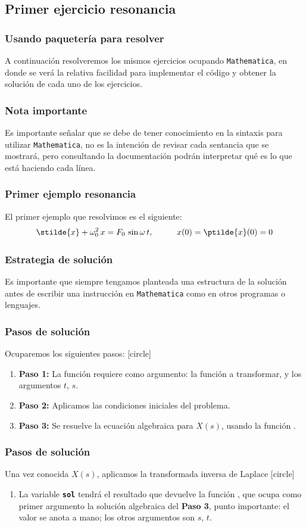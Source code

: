 \subsection{Primer ejercicio resonancia}
\begin{frame}
\frametitle{Usando paquetería para resolver}
A continuación resolveremos los mismos ejercicios ocupando \texttt{Mathematica}, en donde se verá la relativa facilidad para implementar el código y obtener la solución de cada uno de los ejercicios.
\end{frame}
\begin{frame}
\frametitle{Nota importante}
Es importante señalar que se debe de tener conocimiento en la sintaxis para utilizar \texttt{Mathematica}, no es la intención de revisar cada sentancia que se mostrará, pero consultando la documentación podrán interpretar qué es lo que está haciendo cada línea.
\end{frame}
\begin{frame}
\frametitle{Primer ejemplo resonancia}
El primer ejemplo que resolvimos es el siguiente:
\begin{align*}
\stilde{x} + \omega_{0}^{2} \, x = F_{0} \, \sin \omega \, t, \hspace{1cm} x(0) = \ptilde{x} (0) = 0
\end{align*}
\end{frame}
\begin{frame}
\frametitle{Estrategia de solución}
Es importante que siempre tengamos planteada una estructura de la solución antes de escribir una instrucción en \texttt{Mathematica} como en otros programas o lenguajes.
\end{frame}
\begin{frame}
\frametitle{Pasos de solución}
Ocuparemos los siguientes pasos:
[circle]
\begin{enumerate}[<+->]
\item \textbf{Paso 1: } La función  requiere como argumento: la función a transformar, y los argumentos $t$, $s$.
\item \textbf{Paso 2: } Aplicamos las condiciones iniciales del problema.
\item \textbf{Paso 3: } Se resuelve la ecuación algebraica para $X(s)$, usando la función .
\seti
\end{enumerate}
\end{frame}
\begin{frame}
\frametitle{Pasos de solución}
Una vez conocida $X(s)$, aplicamos la transformada inversa de Laplace
[circle]
\begin{enumerate}[<+->]
\conti
\item La variable \texttt{\textbf{sol}} tendrá el resultado que devuelve la función , que ocupa como primer argumento la solución algebraica del \textbf{Paso 3}, punto importante: el valor se anota a mano; los otros argumentos son $s$, $t$.
\seti
\end{enumerate}
\end{frame}
